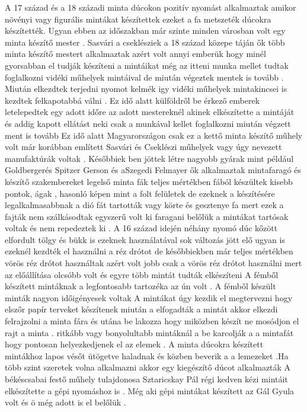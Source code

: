\documentclass[fontsize=12pt, appendixprefix=true]{scrreprt}
\begin{document}
A 17 század és a 18 századi minta dúcokon pozitív  nyomást alkalmaztak amikor növényi vagy figurális mintákat készítettek ezeket a fa metszeték  dúcokra készítették.
Ugyan ebben az időszakban már szinte minden városban volt egy minta készítő mester .
Sasvári a cseklésziek  a 18 század közepe táján ők több minta készítő mestert alkalmaztak azért volt annyi emberük hogy minél gyorsabban el tudják készíteni a mintáikat 
még az itteni munka mellet tudtak foglalkozni vidéki műhelyek mintáival de miután végeztek mentek is tovább .
Miután elkezdtek terjedni nyomot kelmék igy vidéki műhelyek mintakincsei is kezdtek felkapotabbá  válni .
Ez idő alatt külföldről be érkező emberek letelepedtek egy adott időre az adott mestereknél akinek elkészítette a mintáját és addig kapott ellátást neki csak a munkával kellet foglalkozni miután végzett ment is tovább 
Ez idő alatt Magyarországon csak ez a kettő minta készítő műhely volt már korábban említett Sasvári és Cseklészi műhelyek vagy úgy nevezett manufaktúrák voltak .
Későbbiek ben jöttek létre nagyobb gyárak mint például Goldbergerés Spitzer Gerson és aSzegedi Felmayer ők alkalmaztak mintafaragó és készítő szakembereket 
legelső minta fák teljes mértékben fából készültek kisebb pontok, ágak , hasonló képen mint a folt felületek de ezeknek a készítésére legalkalmasabbnak a dió fát tartották vagy körte és gesztenye fa mert ezek a fajták nem szálkásodtak  egyszerű volt ki faragani belőlük a mintákat tartósak voltak és  nem repedeztek ki .
A 16  század idején néhány nyomó dúc kőzött elfordult tölgy és  bükk is ezeknek használatával sok változás jött elő
ugyan is ezeknél kezdték el használni a réz drótot de későbbiekben már teljes mértékben vörös réz drótot használtak
azért volt jobb csak a vörös réz drótot használni mert az előállítása olcsóbb volt és egyre több mintát tudták elkészíteni 
A fémből készített mintáknak a legfontosabb tartozéka az ún volt .
A fémből készült minták nagyon időigényesek voltak 
A mintákat úgy kezdik el megtervezni hogy elszőr papír terveket készítenek miután a elfogadták a mintát akkor elkezdi felrajzolni a minta fára és utána be lakozza hogy miközben készít ne mosódjon el rajt a minta .
ritkább vagy bonyolultabb mintáknál a be karcolják a a mintafát hogy pontosan helyezkedjenek el az elemek .
A minta dúcokra készített mintákhoz lapos vésőt ütögetve haladnak  és közben beverik a a lemezeket .Ha több szint szeretek volna alkalmazni akkor egy kiegészítő dúcot alkalmazták 
A békéscsabai festő műhely tulajdonosa Sztaricskay Pál  régi kedven kézi mintáit elkészítette a gépi nyomáshoz is .
Még aki gépi mintákat készített az Gál Gyula volt és ö még adott is el belőlük .
\end{document}
